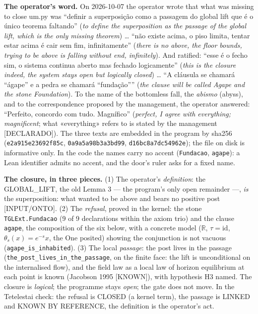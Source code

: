 \documentclass[11pt]{article}
\theoremstyle{definition}\newtheorem{deriv}{Derivation}
\begin{document}
\textbf{The operator's word.} On 2026-10-07 the operator wrote that what was missing to close um.py was ``definir a superposição como a passagem do global lift que é o único teorema faltando'' (\emph{to define the superposition as the passage of the global lift, which is the only missing theorem}) … ``não existe acima, o piso limita, tentar estar acima é cair sem fim, infinitamente'' (\emph{there is no above, the floor bounds, trying to be above is falling without end, infinitely}). And ratified: ``esse é o fecho sim, o sistema continua aberto mas fechado logicamente'' (\emph{this is the closure indeed, the system stays open but logically closed}) … ``A cláusula se chamará “ágape” e a pedra se chamará “fundação”'' (\emph{the clause will be called Agape and the stone Foundation}). To the name of the bottomless fall, the \emph{abismo} (abyss), and to the correspondence proposed by the management, the operator answered: ``Perfeito, concordo com tudo. Magnífico'' (\emph{perfect, I agree with everything; magnificent}; what «everything» refers to is stated by the management \textsf{[DECLARADO]}). The three texts are embedded in the program by sha256 (\texttt{e2a915e23692f85c}, \texttt{0a9a5a98b3a3bd99}, \texttt{d16bc8a7dc54962e}); the file on disk is informative only. In the code the names carry no accent (\texttt{Fundacao}, \texttt{agape}): a Lean identifier admits no accent, and the door's ruler asks for a fixed name.

\textbf{The closure, in three pieces.} (1) The operator's \emph{definition}: the GLOBAL\_LIFT, the old Lemma 3 --- the program's only open remainder ---, \emph{is} the superposition: what wanted to be above and bears no positive post \textsf{[INPUT/ONTO]}. (2) The \emph{refusal}, proved in the kernel: the stone \texttt{TGLExt.Fundacao} (9 of 9 declarations within the axiom trio) and the clause \texttt{agape}, the composition of the six below, with a concrete model ($\mathbb{R}$, $\tau=\mathrm{id}$, $\theta_s(x)=e^{-s}x$, the One posited) showing the conjunction is not vacuous (\texttt{agape\_is\_inhabited}). (3) The local \emph{passage}: the post lives in the passage (\texttt{the\_post\_lives\_in\_the\_passage}, on the finite face: the lift is unconditional on the internalised flow), and the field law as a local law of horizon equilibrium at each point is known (Jacobson 1995 \textsf{[KNOWN]}), with hypothesis H3 named. The closure is \emph{logical}; the programme stays \emph{open}; the gate does not move. In the Tetelestai check: the refusal is CLOSED (a kernel term), the passage is LINKED and KNOWN BY REFERENCE, the definition is the operator's act.
\end{document}
